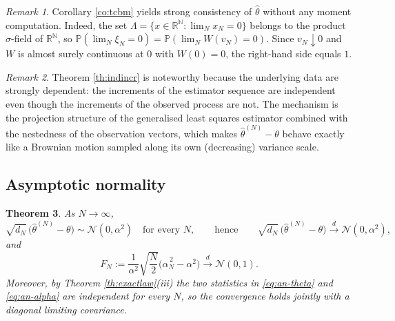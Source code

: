 \documentclass[11pt,reqno]{amsart}
\numberwithin{equation}{section}
\theoremstyle{plain}
\newtheorem{theorem}{Theorem}[section]
\theoremstyle{definition}
\theoremstyle{remark}
\newtheorem{remark}[theorem]{Remark}
\newcommand{\R}{\mathbb{R}}
\newcommand{\N}{\mathbb{N}}
\newcommand{\Prob}{\mathbb{P}}
\newcommand{\Norm}{\mathcal{N}}
\begin{document}
\begin{remark}\label{re:secondproof}
Corollary \ref{co:tcbm} yields strong consistency of $\widehat\theta$ without any moment
computation. Indeed, the set $\Lambda=\{x\in\R^{\N}:\lim_Nx_N=0\}$ belongs to the product
$\sigma$-field of $\R^{\N}$, so
$\Prob(\lim_N\xi_N=0)=\Prob(\lim_NW(v_N)=0)$. Since $v_N\downarrow0$ and $W$ is almost
surely continuous at $0$ with $W(0)=0$, the right-hand side equals $1$.
\end{remark}

\begin{remark}\label{re:indincrcomment}
Theorem \ref{th:indincr} is noteworthy because the underlying data are strongly
dependent: the increments of the estimator sequence are independent even though the
increments of the observed process are not. The mechanism is the projection structure of
the generalised least squares estimator combined with the nestedness of the observation
vectors, which makes $\widehat\theta^{(N)}-\theta$ behave exactly like a Brownian motion
sampled along its own (decreasing) variance scale.
\end{remark}

\subsection{Asymptotic normality}

\begin{theorem}\label{th:an}
As $N\to\infty$,
\begin{equation}\label{eq:an-theta}
  \sqrt{d_N}\,\bigl(\widehat\theta^{(N)}-\theta\bigr)\sim\Norm(0,\alpha^{2})
  \quad\text{for every }N,\qquad\text{hence}\qquad
  \sqrt{d_N}\,\bigl(\widehat\theta^{(N)}-\theta\bigr)\xrightarrow{\ d\ }
  \Norm(0,\alpha^{2}),
\end{equation}
and
\begin{equation}\label{eq:an-alpha}
  F_N:=\frac{1}{\alpha^{2}}\sqrt{\frac N2}
  \bigl(\widehat\alpha^{\,2}_N-\alpha^{2}\bigr)\xrightarrow{\ d\ }\Norm(0,1).
\end{equation}
Moreover, by Theorem \ref{th:exactlaw}(iii) the two statistics in \eqref{eq:an-theta} and
\eqref{eq:an-alpha} are independent for every $N$, so the convergence holds jointly with
a diagonal limiting covariance.
\end{theorem}
\end{document}
